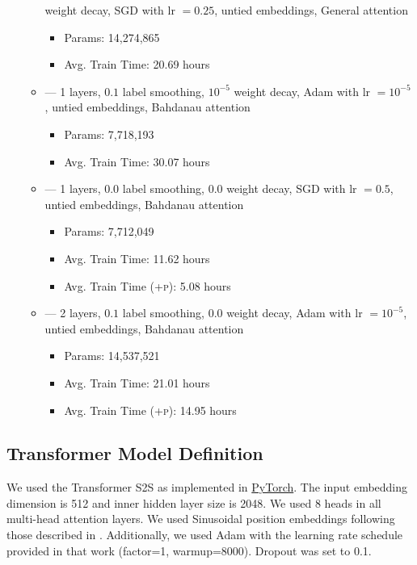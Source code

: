 \begin{itemize}
\begin{itemize}
        weight decay, SGD with lr $=0.25$, untied embeddings, General attention
        \begin{itemize}
            \item Params: 14,274,865
            \item Avg. Train Time: 20.69 hours
        \end{itemize}
    \item {} --- 1 layers, $0.1$ label smoothing, $10^{-5}$
        weight decay, Adam with lr $=10^{-5}$, untied embeddings, Bahdanau attention
        \begin{itemize}
            \item Params: 7,718,193
            \item Avg. Train Time: 30.07 hours
        \end{itemize}
    \item {} --- 1 layers, $0.0$ label smoothing, $0.0$
        weight decay, SGD with lr $=0.5$, untied embeddings, Bahdanau attention
        \begin{itemize}
            \item Params: 7,712,049
            \item Avg. Train Time: 11.62 hours
            \item Avg. Train Time (\textsc{+p}): 5.08 hours
        \end{itemize}
    \item {} --- 2 layers, $0.1$ label smoothing, $0.0$
        weight decay, Adam with lr $=10^{-5}$, untied embeddings, Bahdanau attention
        \begin{itemize}
            \item Params: 14,537,521
            \item Avg. Train Time: 21.01 hours
            \item Avg. Train Time (\textsc{+p}): 14.95 hours
        \end{itemize}
\end{itemize}
\end{itemize}




\subsection{Transformer Model Definition}

We used the Transformer S2S as implemented in 
\href{https://pytorch.org/}{PyTorch}.
The input embedding dimension is 512 and inner hidden layer size is 2048.
We used 8 heads in all multi-head attention layers. 
We used Sinusoidal position embeddings following those described in 
\citet{rush2018}. Additionally, we used Adam with the learning
rate schedule provided in that work (factor=1, warmup=8000).
Dropout was set to 0.1.


